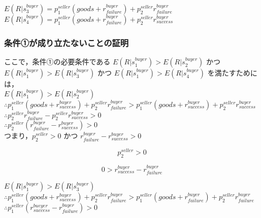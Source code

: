 $ E(R|s^{buyer}_3)=p^{seller}_1 (goods + r^{buyer}_{failure}) + p^{seller}_2 r^{buyer}_{failure}$ \\

$ E(R|s^{buyer}_4)=p^{seller}_1 (goods + r^{buyer}_{failure}) + p^{seller}_2 r^{buyer}_{success}$ \\

\subsubsection{条件①が成り立たないことの証明}

ここで，条件①の必要条件である
$E(R|s^{buyer}_1)>E(R|s^{buyer}_2)$
かつ
$E(R|s^{buyer}_1)>E(R|s^{buyer}_3)$
かつ
$E(R|s^{buyer}_1)>E(R|s^{buyer}_4)$
を満たすためには，\\

$ E(R|s^{buyer}_1) > E(R|s^{buyer}_2)$ \\

$\therefore p^{seller}_1 (goods + r^{buyer}_{success}) + p^{seller}_2 r^{buyer}_{failure} > p^{seller}_1 (goods + r^{buyer}_{success}) + p^{seller}_2 r^{buyer}_{success}$ \\

$\therefore p^{seller}_2 r^{buyer}_{failure} - p^{seller}_2 r^{buyer}_{success} > 0$ \\

$\therefore p^{seller}_2 (r^{buyer}_{failure} - r^{buyer}_{success}) > 0$ \\

つまり，$ p^{seller}_2 > 0$ かつ $ r^{buyer}_{failure} - r^{buyer}_{success} > 0$

\begin{equation}
  p^{seller}_2 > 0
\end{equation}

\begin{equation}
\label{quad1}
  0 > r^{buyer}_{success} - r^{buyer}_{failure}
\end{equation}

$ E(R|s^{buyer}_1) > E(R|s^{buyer}_3)$ \\

$ \therefore p^{seller}_1(goods + r^{buyer}_{success}) + p^{seller}_2r^{buyer}_{failure}>
  p^{seller}_1(goods + r^{buyer}_{failure}) + p^{seller}_2r^{buyer}_{failure}$\\

$ \therefore p^{seller}_1 (r^{bueyer}_{success} - r^{buyer}_{failure}) > 0$\\

